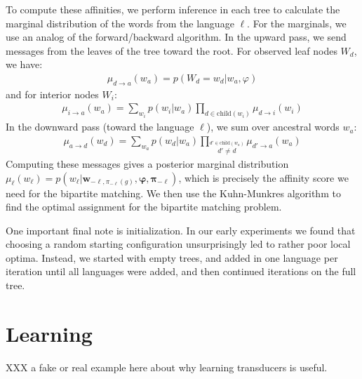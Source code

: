 \documentclass[11pt,a4paper]{article}
\begin{document}
To compute these affinities, we perform
inference in each tree to calculate the marginal distribution of
the words from the language $\ell$. For the marginals, we use an
analog of the forward/backward algorithm. In the upward pass, we
send messages from the leaves of the tree toward the root. For
observed leaf nodes $W_d$, we have:
\begin{equation*}
  \begin{split}
    \mu_{d\to a}(w_a) = p(W_d = w_d|w_a,\varphi)
   \end{split}
 \end{equation*}
and for interior nodes $W_i$:
\begin{equation}
  \label{eqn:summing}
  \begin{split}
    \mu_{i\to a}(w_a) = \sum_{w_i} p(w_i|w_a) \prod_{d \in \mathrm{child}(w_i)} \mu_{d \to i}(w_i) 
  \end{split}
\end{equation}
In the downward pass (toward the language $\ell$), we sum over ancestral words $w_a$:
\begin{equation*}
  \begin{split}
    \mu_{a\to d}(w_d) = \sum_{w_a} p(w_d|w_a) \prod_{\stackrel{d' \in \mathrm{child}(w_a)}{d' \neq d}} \mu_{d' \to a}(w_a) 
  \end{split}
\end{equation*}
Computing these messages gives a posterior marginal distribution
$\mu_\ell(w_\ell) = p(w_\ell|\mathbf w_{-\ell,\pi_{-\ell}(g)},\mathbf \varphi,\mathbf\pi_{-\ell})$,
which is precisely the affinity score
we need for the bipartite matching. We then use the Kuhn-Munkres
algorithm \cite{Kuhn1955} to find the optimal assignment for the
bipartite matching problem.

One important final note is initialization. In our early experiments
we found that choosing a random starting configuration unsurprisingly led
to rather poor local optima. Instead, we started with empty trees,
and added in one language per iteration until all languages were
added, and then continued iterations on the full tree.

\section{Learning}

XXX a fake or real example here about why learning transducers is useful.
\end{document}
